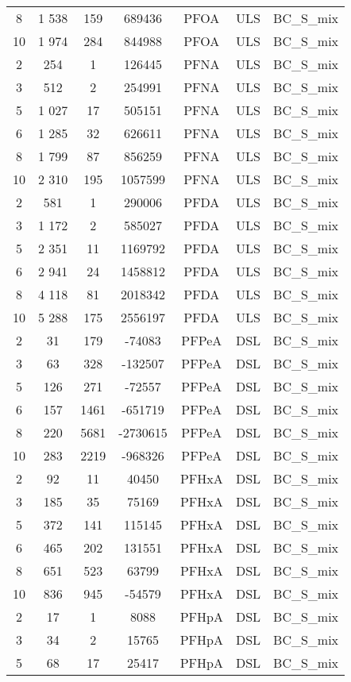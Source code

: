 \begin{longtable}[c]{ccccccc}
8 & 1 538 & 159 & 689436 & PFOA & ULS & BC\_S\_mix \\
10 & 1 974 & 284 & 844988 & PFOA & ULS & BC\_S\_mix \\
2 & 254 & 1 & 126445 & PFNA & ULS & BC\_S\_mix \\
3 & 512 & 2 & 254991 & PFNA & ULS & BC\_S\_mix \\
5 & 1 027 & 17 & 505151 & PFNA & ULS & BC\_S\_mix \\
6 & 1 285 & 32 & 626611 & PFNA & ULS & BC\_S\_mix \\
8 & 1 799 & 87 & 856259 & PFNA & ULS & BC\_S\_mix \\
10 & 2 310 & 195 & 1057599 & PFNA & ULS & BC\_S\_mix \\
2 & 581 & 1 & 290006 & PFDA & ULS & BC\_S\_mix \\
3 & 1 172 & 2 & 585027 & PFDA & ULS & BC\_S\_mix \\
5 & 2 351 & 11 & 1169792 & PFDA & ULS & BC\_S\_mix \\
6 & 2 941 & 24 & 1458812 & PFDA & ULS & BC\_S\_mix \\
8 & 4 118 & 81 & 2018342 & PFDA & ULS & BC\_S\_mix \\
10 & 5 288 & 175 & 2556197 & PFDA & ULS & BC\_S\_mix \\
2 & 31 & 179 & -74083 & PFPeA & DSL & BC\_S\_mix \\
3 & 63 & 328 & -132507 & PFPeA & DSL & BC\_S\_mix \\
5 & 126 & 271 & -72557 & PFPeA & DSL & BC\_S\_mix \\
6 & 157 & 1461 & -651719 & PFPeA & DSL & BC\_S\_mix \\
8 & 220 & 5681 & -2730615 & PFPeA & DSL & BC\_S\_mix \\
10 & 283 & 2219 & -968326 & PFPeA & DSL & BC\_S\_mix \\
2 & 92 & 11 & 40450 & PFHxA & DSL & BC\_S\_mix \\
3 & 185 & 35 & 75169 & PFHxA & DSL & BC\_S\_mix \\
5 & 372 & 141 & 115145 & PFHxA & DSL & BC\_S\_mix \\
6 & 465 & 202 & 131551 & PFHxA & DSL & BC\_S\_mix \\
8 & 651 & 523 & 63799 & PFHxA & DSL & BC\_S\_mix \\
10 & 836 & 945 & -54579 & PFHxA & DSL & BC\_S\_mix \\
2 & 17 & 1 & 8088 & PFHpA & DSL & BC\_S\_mix \\
3 & 34 & 2 & 15765 & PFHpA & DSL & BC\_S\_mix \\
5 & 68 & 17 & 25417 & PFHpA & DSL & BC\_S\_mix \\

\end{longtable}
